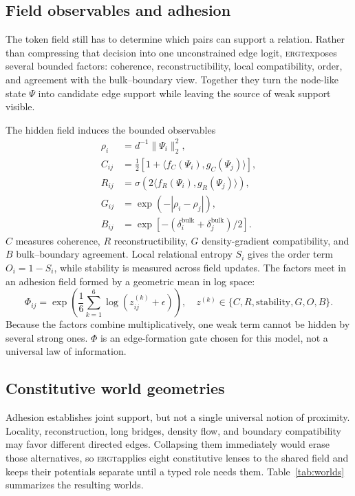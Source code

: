 \documentclass[11pt]{article}
\newcommand{\ERGT}{\textsc{ergt}}
\begin{document}
\subsection{Field observables and adhesion}

The token field still has to determine which pairs can support a relation.
Rather than compressing that decision into one unconstrained edge logit,
\ERGT exposes several bounded factors: coherence, reconstructibility, local
compatibility, order, and agreement with the bulk--boundary view. Together they
turn the node-like state $\Psi$ into candidate edge support while leaving the
source of weak support visible.

The hidden field induces the bounded observables
\begin{align}
\rho_i &= d^{-1}\|\Psi_i\|_2^2, \\
C_{ij} &= \tfrac12\!\left[1+\langle f_C(\Psi_i),g_C(\Psi_j)\rangle\right], \\
R_{ij} &= \sigma\!\left(2\langle f_R(\Psi_i),g_R(\Psi_j)\rangle\right), \\
G_{ij} &= \exp(-|\rho_i-\rho_j|), \\
B_{ij} &= \exp[-(\delta_i^{\mathrm{bulk}}+
                         \delta_j^{\mathrm{bulk}})/2].
\end{align}
$C$ measures coherence, $R$ reconstructibility, $G$ density-gradient
compatibility, and $B$ bulk--boundary agreement. Local relational entropy
$S_i$ gives the order term $O_i=1-S_i$, while stability is measured across
field updates. The factors meet in an adhesion field formed by a geometric mean
in log space:
\begin{equation}
\Phi_{ij}=\exp\!\left(\frac{1}{6}\sum_{k=1}^{6}
                         \log(z_{ij}^{(k)}+\epsilon)\right),
\quad
z^{(k)}\in\{C,R,\mathrm{stability},G,O,B\}.
\label{eq:adhesion}
\end{equation}
Because the factors combine multiplicatively, one weak term cannot be hidden
by several strong ones. $\Phi$ is an edge-formation gate chosen for this model,
not a universal law of information.

\subsection{Constitutive world geometries}

Adhesion establishes joint support, but not a single universal notion of
proximity. Locality, reconstruction, long bridges, density flow, and boundary
compatibility may favor different directed edges. Collapsing them immediately
would erase those alternatives, so \ERGT applies eight constitutive lenses to
the shared field and keeps their potentials separate until a typed role needs
them. Table~\ref{tab:worlds} summarizes the resulting worlds.
\end{document}
